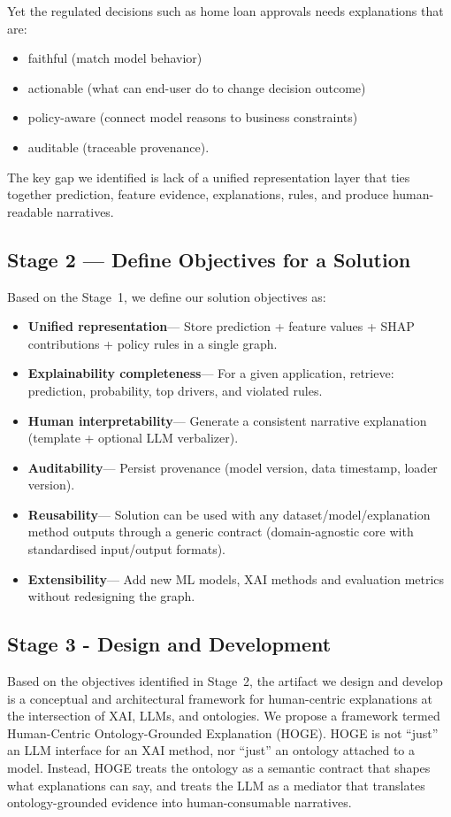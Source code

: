 \documentclass[lnbip]{svmultln}
\begin{document}
Yet the regulated decisions such as home loan approvals needs explanations that are:
\begin{itemize}
    \item faithful (match model behavior)
    \item actionable (what can end-user do to change decision outcome)
    \item policy-aware (connect model reasons to business constraints)
    \item auditable (traceable provenance).
\end{itemize}
The key gap we identified is lack of a unified representation layer that ties together prediction, feature evidence, explanations, rules, and produce human-readable narratives.

\subsection{Stage 2 --- Define Objectives for a Solution}
Based on the Stage~1, we define our solution objectives as:
\begin{itemize}
    \item \textbf{Unified representation}--- Store prediction + feature values + SHAP contributions + policy rules in a single graph.
    \item \textbf{Explainability completeness}--- For a given application, retrieve: prediction, probability, top drivers, and violated rules.
    \item \textbf{Human interpretability}--- Generate a consistent narrative explanation (template + optional LLM verbalizer).
    \item \textbf{Auditability}--- Persist provenance (model version, data timestamp, loader version).
    \item \textbf{Reusability}--- Solution can be used with any dataset/model/explanation method outputs through a generic contract (domain-agnostic core with standardised input/output formats).
    \item \textbf{Extensibility}--- Add new ML models, XAI methods and evaluation metrics without redesigning the graph.
\end{itemize}

\subsection{Stage 3 - Design and Development}

Based on the objectives identified in Stage~2, the artifact we design and develop is a conceptual and architectural framework for human-centric explanations at the intersection of XAI, LLMs, and ontologies. 
We propose a framework termed Human-Centric Ontology-Grounded Explanation (HOGE). HOGE is not ``just'' an LLM interface for an XAI method, nor ``just'' an ontology attached to a model. Instead, HOGE treats the ontology as a semantic contract that shapes what explanations can say, and treats the LLM as a mediator that translates ontology-grounded evidence into human-consumable narratives.
\end{document}
